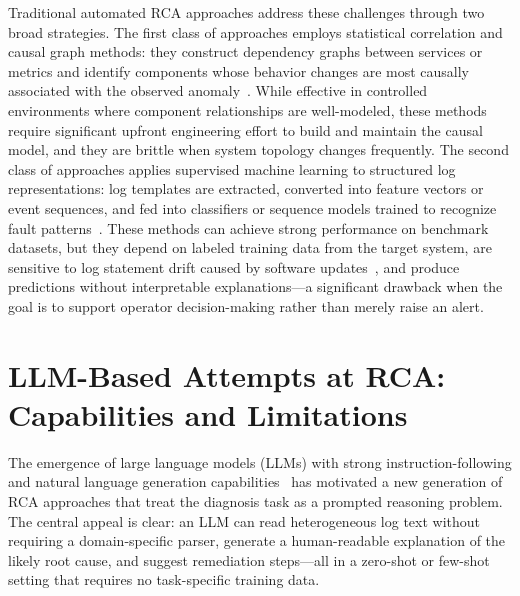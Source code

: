 Traditional automated RCA approaches address these challenges through two broad strategies.
The first class of approaches employs statistical correlation and causal graph methods: they
construct dependency graphs between services or metrics and identify components whose
behavior changes are most causally associated with the observed
anomaly~\cite{wang2018cloudranger,meng2020localizing,chen2014causeinfer}. While effective in
controlled environments where component relationships are well-modeled, these methods require
significant upfront engineering effort to build and maintain the causal model, and they are
brittle when system topology changes frequently. The second class of approaches applies supervised
machine learning to structured log representations: log templates are extracted, converted into
feature vectors or event sequences, and fed into classifiers or sequence models trained to
recognize fault patterns~\cite{xu2009consolelogs}. These methods can achieve strong performance
on benchmark datasets, but they depend on labeled training data from the target system, are
sensitive to log statement drift caused by software updates~\cite{zhang2019logrobust}, and
produce predictions without interpretable explanations---a significant drawback when the goal is
to support operator decision-making rather than merely raise an alert.

\section{LLM-Based Attempts at RCA: Capabilities and Limitations}

The emergence of large language models (LLMs) with strong instruction-following and natural
language generation capabilities~\cite{brown2020languagemodelsfewshotlearners,ouyang2022traininglanguagemodelsfollow}
has motivated a new generation of RCA approaches that treat the diagnosis task as a prompted
reasoning problem. The central appeal is clear: an LLM can read heterogeneous log text without
requiring a domain-specific parser, generate a human-readable explanation of the likely root cause,
and suggest remediation steps---all in a zero-shot or few-shot setting that requires no task-specific
training data.

